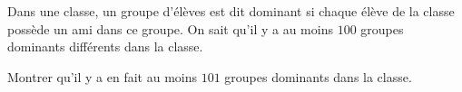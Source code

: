 Dans une classe, un groupe d'élèves est dit dominant si chaque élève de la classe possède un ami dans ce groupe. On sait qu'il y a au moins $100$ groupes dominants différents dans la classe.

Montrer qu'il y a en fait au moins $101$ groupes dominants dans la classe.